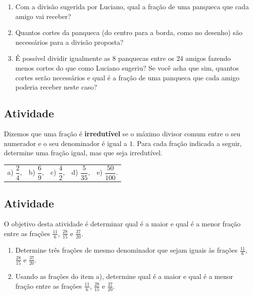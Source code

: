 \begin{enumerate} [\quad a)] %
  \item     Com a divisão sugerida por Luciano, qual a fração de uma panqueca que cada amigo vai receber?
  \item     Quantos cortes da panqueca (do centro para a borda, como no desenho) são necessários para a divisão proposta?
  \item     É possível dividir igualmente as     $8$ panquecas entre os     $24$ amigos fazendo menos cortes do que como Luciano sugeriu? Se você acha que sim, quantos cortes serão necessários e qual é a fração de uma panqueca que cada amigo poderia receber neste caso?
\end{enumerate} %

\subsection{Atividade}

Dizemos que uma fração é {\bf irredutível} se o máximo divisor comum entre o seu numerador e o seu denominador é igual a $1$. Para cada fração indicada a seguir, determine uma fração igual, mas que seja irredutível.
\vspace{.2cm}

\begin{tabular}{m{}m{}m{}m{}m{}}
a) $\dfrac{2}{4}$, & b) $\dfrac{6}{9}$, & c) $\dfrac{4}{2}$, & d) $\dfrac{5}{35}$, & e) $\dfrac{50}{100}$. 
\end{tabular}

\subsection{Atividade}

O objetivo desta atividade é determinar qual é a maior e qual é a menor fração entre
as frações $\frac{11}{6}$, $\frac{28}{15}$ e $\frac{37}{20}$.

\begin{enumerate} [\quad a)] %
  \item     Determine três frações de mesmo denominador que sejam iguais às frações     $\frac{11}{6}$,     $\frac{28}{15}$ e     $\frac{37}{20}$.
  \item     Usando as frações do item a), determine qual é a maior e qual é a menor fração entre as frações     $\frac{11}{6}$,     $\frac{28}{15}$ e     $\frac{37}{20}$.
\end{enumerate} %

